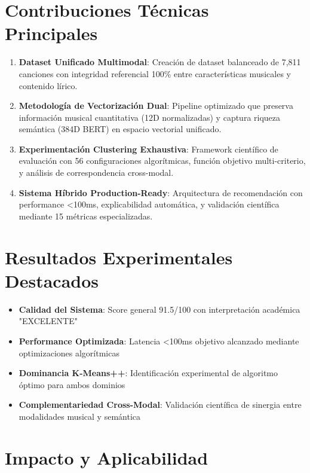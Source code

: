 \documentclass[12pt,a4paper]{report}
\begin{document}
\section*{Contribuciones Técnicas Principales}

\begin{enumerate}
\item \textbf{Dataset Unificado Multimodal}: Creación de dataset balanceado de 7,811 canciones con integridad referencial 100\% entre características musicales y contenido lírico.

\item \textbf{Metodología de Vectorización Dual}: Pipeline optimizado que preserva información musical cuantitativa (12D normalizadas) y captura riqueza semántica (384D BERT) en espacio vectorial unificado.

\item \textbf{Experimentación Clustering Exhaustiva}: Framework científico de evaluación con 56 configuraciones algorítmicas, función objetivo multi-criterio, y análisis de correspondencia cross-modal.

\item \textbf{Sistema Híbrido Production-Ready}: Arquitectura de recomendación con performance <100ms, explicabilidad automática, y validación científica mediante 15 métricas especializadas.
\end{enumerate}

\section*{Resultados Experimentales Destacados}

\begin{itemize}
\item \textbf{Calidad del Sistema}: Score general 91.5/100 con interpretación académica "EXCELENTE"
\item \textbf{Performance Optimizada}: Latencia <100ms objetivo alcanzado mediante optimizaciones algorítmicas
\item \textbf{Dominancia K-Means++}: Identificación experimental de algoritmo óptimo para ambos dominios
\item \textbf{Complementariedad Cross-Modal}: Validación científica de sinergia entre modalidades musical y semántica
\end{itemize}

\section*{Impacto y Aplicabilidad}
\end{document}
